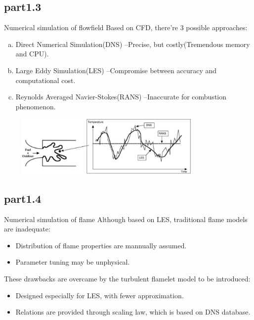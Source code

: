 	\subsection{part1.3}
		\begin{xframe}{Numerical simulation of flowfield}
			Based on CFD, there're 3 possible approaches:
			\begin{enumerate}[(a)]
				\item{Direct Numerical Simulation(DNS)}\newline
					--Precise, but costly(Tremendous memory and CPU). %
				\item Large Eddy Simulation(LES)\newline
					--Compromise between accuracy and computational cost. %
				\item Reynolds Averaged Navier-Stokes(RANS)\newline
					--Inaccurate for combustion phenomenon. %
			\end{enumerate}
			\includegraphics[width=11cm, height=3cm]{../pic/comparision.png}
		\end{xframe}
	\subsection{part1.4}
		\begin{xframe}{Numerical simulation of flame}
			Although based on LES, traditional flame models are inadequate:
			\begin{itemize}
				\item
					Distribution of flame properties are mannually assumed.
				\item
					Parameter tuning may be unphysical.
			\end{itemize}
			\pause
			These drawbacks are overcame by the turbulent flamelet model to be introduced:
			\begin{itemize}
				\item
					Designed especially for LES, with fewer approximation.
				\item
					Relations are provided through scaling law, which is based on DNS database\cite{RN2}.
			\end{itemize}		
		\end{xframe}
